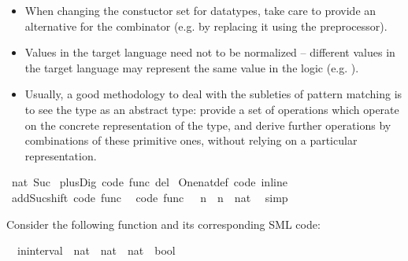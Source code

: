 \begin{isabellebody}
\begin{isamarkuptext}
  \begin{itemize}
    \item When changing the constuctor set for datatypes, take care to
      provide an alternative for the  combinator (e.g. by replacing
      it using the preprocessor).
    \item Values in the target language need not to be normalized -- different
      values in the target language may represent the same value in the
      logic (e.g. ).
    \item Usually, a good methodology to deal with the subleties of pattern
      matching is to see the type as an abstract type: provide a set
      of operations which operate on the concrete representation of the type,
      and derive further operations by combinations of these primitive ones,
      without relying on a particular representation.
  \end{itemize}%
\end{isamarkuptext}%
\isamarkuptrue%
%
\isadeliminvisible
%
\endisadeliminvisible
%
\isataginvisible
{}\isamarkupfalse%
\ {\isachardoublequoteopen}{}{\isacharcolon}{\isacharcolon}nat{\isachardoublequoteclose}\ Suc\isanewline
{}\isamarkupfalse%
\ plus{\isacharunderscore}Dig\ {\isacharbrackleft}code\ func\ del{\isacharbrackright}\isanewline
{}\isamarkupfalse%
\ One{\isacharunderscore}nat{\isacharunderscore}def\ {\isacharbrackleft}code\ inline{\isacharbrackright}\isanewline
{}\isamarkupfalse%
\ add{\isacharunderscore}Suc{\isacharunderscore}shift\ {\isacharbrackleft}code\ func{\isacharbrackright}\ \isanewline
{}\isamarkupfalse%
\ {\isacharbrackleft}code\ func{\isacharbrackright}{\isacharcolon}\ {\isachardoublequoteopen}{}\ {\isacharplus}\ n\ {\isacharequal}\ {\isacharparenleft}n\ {\isasymColon}\ nat{\isacharparenright}{\isachardoublequoteclose}\ \isamarkupfalse%
\ simp%
\endisataginvisible
{\isafoldinvisible}%
%
\isadeliminvisible
%
\endisadeliminvisible
%
\isamarkuptrue%
%
\isamarkuptrue%
%
\begin{isamarkuptext}%
Consider the following function and its corresponding
  SML code:%
\end{isamarkuptext}%
\isamarkuptrue%
\isamarkupfalse%
\isanewline
\ \ in{\isacharunderscore}interval\ {\isacharcolon}{\isacharcolon}\ {\isachardoublequoteopen}nat\ {\isasymtimes}\ nat\ {\isasymRightarrow}\ nat\ {\isasymRightarrow}\ bool{\isachardoublequoteclose}\ \isanewline

\end{isabellebody}
